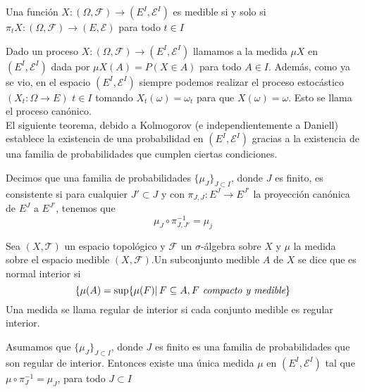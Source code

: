     \begin{Lem}
      Una función $X:(\Omega,\mathscr{F})\rightarrow (E^I,\mathscr{E}^I)$ es medible si y solo si $\pi_t X:(\Omega,\mathscr{F})\rightarrow (E,\mathscr{E})$ para todo $t\in I$
    \end{Lem}
    Dado un proceso $X:(\Omega,\mathscr{F})\rightarrow (E^I,\mathscr{E}^I)$ llamamos a la medida $\mu X$ en $(E^I,\mathscr{E}^I)$ dada por $\mu X(A)= P(X\in A)$ para todo $A\in I$. Además, como ya se vio, en el espacio $(E^I,\mathscr{E}^I)$ siempre podemos realizar el proceso estocástico $(X_t: \Omega \rightarrow E)$ $t\in I$ tomando $X_t(\omega)=\omega_t$ para que $X(\omega)=\omega$. Esto se llama el proceso canónico.
    \\
  El siguiente teorema, debido a Kolmogorov (e independientemente a Daniell) establece la existencia de una probabilidad en $(E^I,\mathscr{E}^I)$ gracias a la existencia de una familia de probabilidades que cumplen ciertas condiciones.
\begin{Def}
    Decimos que una familia de probabilidades $\{\mu_J\}_{J\subset I}$, donde $J$ es finito, es consistente si para cualquier $J'\subset J$ y con $\pi_{J, J}:E^J \rightarrow E^{J'}$ la proyección canónica de $E^J$ a $E^{J'}$, tenemos
     que $$\mu_J \circ \pi_{J,J'}^{-1}= \mu_j$$
\end{Def}
\begin{Def}
    Sea $(X,\mathscr{T})$ un espacio topológico y $\mathscr{F}$ un $\sigma$-álgebra sobre $X$ y $\mu$ la medida sobre el espacio medible $(X, \mathscr{F})$.Un subconjunto medible $A$ de $X$ se dice que es normal interior si
    $$\{\mu(A) = \sup \{\mu(F) |\thinspace F \subseteq A, F \textit{ compacto y medible} \}$$
    Una medida se llama regular de interior si cada conjunto medible es regular interior.
\end{Def}
\begin{Teo}
    Asumamos que $\{\mu_J\}_{J\subset I}$, donde $J$ es finito es una familia de probabilidades que son regular de interior. Entonces existe una única medida $\mu$ en $(E^I, \mathscr{E}^I)$ tal que $\mu\circ\pi_J^{-1}= \mu_J$, para todo $J\subset I$
\end{Teo}
